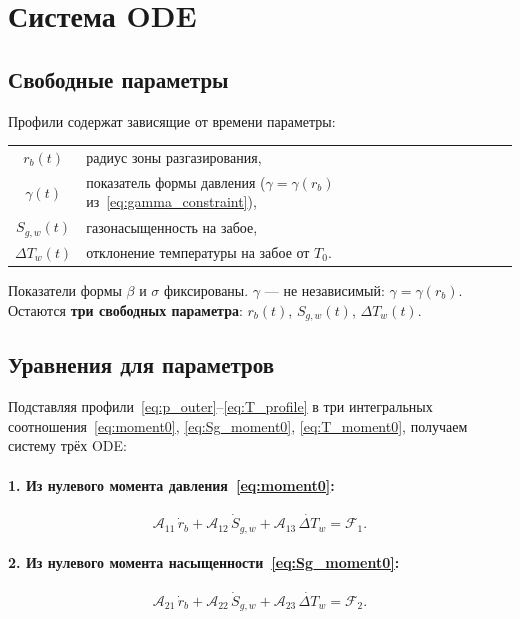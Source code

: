 \documentclass[12pt,a4paper]{article}
\begin{document}
\section{Система ODE}\label{sec:ode}

\subsection{Свободные параметры}

Профили содержат зависящие от времени параметры:
\begin{center}
\begin{tabular}{cl}
  $r_b(t)$       & радиус зоны разгазирования, \\
  $\gamma(t)$    & показатель формы давления
                    ($\gamma = \gamma(r_b)$
                    из~\eqref{eq:gamma_constraint}), \\
  $S_{g,w}(t)$   & газонасыщенность на забое, \\
  $\Delta T_w(t)$ & отклонение температуры на забое от $T_0$.
\end{tabular}
\end{center}

Показатели формы $\beta$ и $\sigma$ фиксированы.
$\gamma$ --- не независимый: $\gamma = \gamma(r_b)$.
Остаются \textbf{три свободных параметра}:
$r_b(t)$, $S_{g,w}(t)$, $\Delta T_w(t)$.

\subsection{Уравнения для параметров}

Подставляя профили~\eqref{eq:p_outer}--\eqref{eq:T_profile}
в три интегральных соотношения~\eqref{eq:moment0},
\eqref{eq:Sg_moment0}, \eqref{eq:T_moment0},
получаем систему трёх ODE:

\paragraph{1. Из нулевого момента давления~\eqref{eq:moment0}:}
\begin{equation}\label{eq:ode1}
  \mathcal{A}_{11}\,\dot{r}_b
  + \mathcal{A}_{12}\,\dot{S}_{g,w}
  + \mathcal{A}_{13}\,\dot{\Delta T}_w
  = \mathcal{F}_1.
\end{equation}

\paragraph{2. Из нулевого момента насыщенности~\eqref{eq:Sg_moment0}:}
\begin{equation}\label{eq:ode2}
  \mathcal{A}_{21}\,\dot{r}_b
  + \mathcal{A}_{22}\,\dot{S}_{g,w}
  + \mathcal{A}_{23}\,\dot{\Delta T}_w
  = \mathcal{F}_2.
\end{equation}
\end{document}
